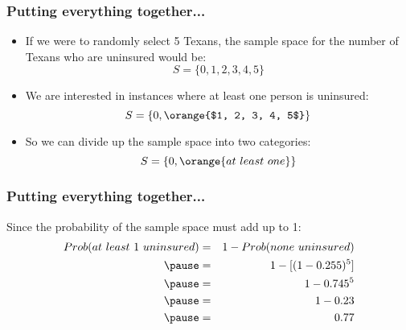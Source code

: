 \documentclass[slidestop,compress,mathserif]{beamer}
\begin{document}

\begin{frame}
\frametitle{Putting everything together...}


\begin{itemize}

\item If we were to randomly select 5 Texans, the sample space for the number of Texans who are uninsured would be:
\[ S = \{0, 1, 2, 3, 4, 5\} \]

\item We are interested in instances where at least one person is uninsured:
\[ S = \{0, \orange{$1, 2, 3, 4, 5$} \} \]

\item So we can divide up the sample space into two categories:
\[ S = \{0, \orange{at~least~one} \} \]

\end{itemize}

\end{frame}


\begin{frame}
\frametitle{Putting everything together...}

Since the probability of the sample space must add up to 1:
\begin{eqnarray*}
Prob(at~least~1~uninsured) &=& 1 - Prob(none~uninsured) \\
\pause
&=& 1 - [(1-0.255)^5] \\
\pause
&=& 1- 0.745^5 \\
\pause
&=& 1 - 0.23 \\
\pause
&=& 0.77
\end{eqnarray*}

$\:$ \\
$\:$ \\


\end{frame}



\end{document}
